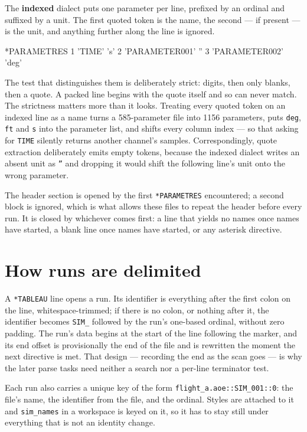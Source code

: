 \documentclass[11pt,a4paper,oneside]{report}
\newcommand{\code}[1]{\texttt{#1}}
\begin{document}
The \textbf{indexed} dialect puts one parameter per line, prefixed by an ordinal
and suffixed by a unit. The first quoted token is the name, the second --- if
present --- is the unit, and anything further along the line is ignored.

\begin{aoecode}
*PARAMETRES
      1 'TIME' 's'
      2 'PARAMETER001'  ''
      3 'PARAMETER002'  'deg'
\end{aoecode}

The test that distinguishes them is deliberately strict: digits, then only
blanks, then a quote. A packed line begins with the quote itself and so can never
match. The strictness matters more than it looks. Treating every quoted token on
an indexed line as a name turns a 585-parameter file into 1156 parameters, puts
\code{deg}, \code{ft} and \code{s} into the parameter list, and shifts every
column index --- so that asking for \code{TIME} silently returns another
channel's samples. Correspondingly, quote extraction deliberately emits empty
tokens, because the indexed dialect writes an absent unit as \code{''} and
dropping it would shift the following line's unit onto the wrong parameter.

The header section is opened by the first \code{*PARAMETRES} encountered; a
second block is ignored, which is what allows these files to repeat the header
before every run. It is closed by whichever comes first: a line that yields no
names once names have started, a blank line once names have started, or any
asterisk directive.

\section{How runs are delimited}

A \code{*TABLEAU} line opens a run. Its identifier is everything after the first
colon on the line, whitespace-trimmed; if there is no colon, or nothing after it,
the identifier becomes \code{SIM\_} followed by the run's one-based ordinal,
without zero padding. The run's data begins at the start of the line following
the marker, and its end offset is provisionally the end of the file and is
rewritten the moment the next directive is met. That design --- recording the end
as the scan goes --- is why the later parse tasks need neither a search nor a
per-line terminator test.

Each run also carries a unique key of the form
\code{flight\_a.aoe::SIM\_001::0}: the file's name, the identifier from the
file, and the ordinal. Styles are attached to it and \code{sim\_names} in a
workspace is keyed on it, so it has to stay still under everything that is not
an identity change.
\end{document}
